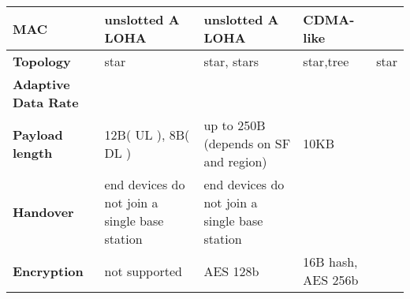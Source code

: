 \begin{table}[h!]
\begin{tabulary}{\textwidth}{L|L|L|L|L}
	\textbf{MAC}                                  & unslotted A LOHA                              & unslotted A LOHA                                              & CDMA-like                                       & \\\hline                                                                       
	\textbf{Topology}                             & star                                          & star, stars                                                   & star,tree                                       & star \\\hline                                                                  
	\textbf{Adaptive Data Rate}                   & \ko                                           & \ok                                                           & \ok                                             & \ko \\\hline                                                                   
	\textbf{Payload length}                       & 12B( UL ), 8B( DL )                           & up to 250B (depends on SF and region)                         & 10KB                                            & \\\hline
	\textbf{Handover}                             & end devices do not join a single base station & end devices do not join a single base station                 &                                                 & \\\hline                                                                       
	\textbf{Encryption}                           & not supported                                 & AES 128b                                                      & 16B hash, AES 256b                              & \\\hline                                                                       
	\end{tabulary}
\caption{\label{tab:edesf} \cite{raza_low_22a}}
\end{table}



